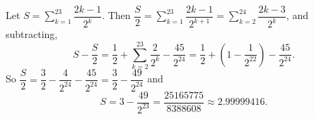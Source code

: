Let $S=\displaystyle\sum_{k=1}^{23}\dfrac{2k-1}{2^k}$. Then $\dfrac {S}{2}=\displaystyle\sum_{k=1}^{23}\dfrac{2k-1}{2^{k+1}}=\sum_{k=2}^{24}\dfrac{2k-3}{2^{k}}$, and subtracting,
\[
S-\dfrac {S}{2}=\dfrac{1}{2}+\sum_{k=2}^{23}\dfrac{2}{2^k}-\dfrac{45}{2^{24}}=\dfrac{1}{2}+\left(1-\dfrac{1}{2^{22}}\right)-\dfrac{45}{2^{24}} .
\]
So $\dfrac {S}{2}=\dfrac{3}{2}-\dfrac{4}{2^{24}}-\dfrac{45}{2^{24}}=\dfrac{3}{2}-\dfrac{49}{2^{24}}$ and
\[
S=3-\dfrac{49}{2^{23}}=\boxed{\dfrac{25165775}{8388608}}\approx2.99999416 .
\]
